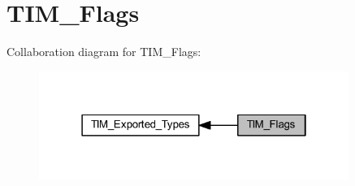 \hypertarget{group___t_i_m___flags}{}\section{T\+I\+M\+\_\+\+Flags}
\label{group___t_i_m___flags}
Collaboration diagram for T\+I\+M\+\_\+\+Flags\+:
\nopagebreak
\begin{figure}[H]
\begin{center}
\leavevmode
\includegraphics[width=286pt]{group___t_i_m___flags}
\end{center}
\end{figure}
